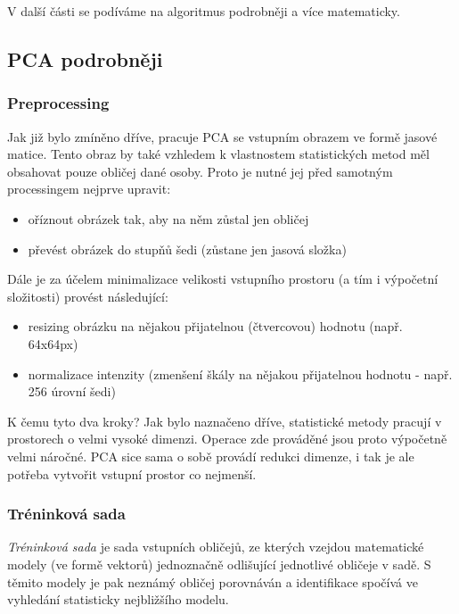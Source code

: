 \documentclass[10pt,a4paper]{article}
\begin{document}
V další části se podíváme na algoritmus podrobněji a více matematicky.

\subsection{PCA podrobněji}

\subsubsection*{Preprocessing}

Jak již bylo zmíněno dříve, pracuje PCA se vstupním obrazem ve formě jasové matice. Tento obraz by také vzhledem k
vlastnostem statistických metod měl obsahovat pouze obličej dané osoby. Proto je nutné jej před samotným processingem
nejprve upravit:

\begin{itemize}
	\item oříznout obrázek tak, aby na něm zůstal jen obličej
	\item převést obrázek do stupňů šedi (zůstane jen jasová složka)
\end{itemize}

Dále je za účelem minimalizace velikosti vstupního prostoru (a tím i výpočetní složitosti) provést následující:

\begin{itemize}
	\item resizing obrázku na nějakou přijatelnou (čtvercovou) hodnotu (např. 64x64px)
	\item normalizace intenzity (zmenšení škály na nějakou přijatelnou hodnotu - např. 256 úrovní šedi)
\end{itemize}

K čemu tyto dva kroky? Jak bylo naznačeno dříve, statistické metody pracují v prostorech o velmi vysoké dimenzi. Operace zde prováděné jsou proto výpočetně velmi náročné. PCA sice sama o sobě provádí redukci dimenze, i tak je ale potřeba
vytvořit vstupní prostor co nejmenší.

\subsubsection*{Tréninková sada}

\textit{Tréninková sada} je sada vstupních obličejů, ze kterých vzejdou matematické modely (ve formě vektorů) jednoznačně
odlišující jednotlivé obličeje v sadě. S těmito modely je pak neznámý obličej porovnáván a identifikace spočívá
ve vyhledání statisticky nejbližšího modelu.
\end{document}
